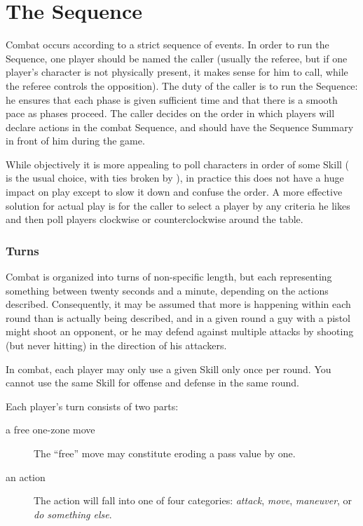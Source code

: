 \section{The Sequence}\label{sec:personal-combat-sequence}

Combat occurs according to a strict sequence of events. In order to run the Sequence, one player should be named the caller (usually the referee, but if one player's character is not physically present, it makes sense for him to call, while the referee controls the opposition). 
The duty of the caller is to run the Sequence: he ensures that each phase is given sufficient time and that there is a smooth pace as phases proceed. 
The caller decides on the order in which players will declare actions in the combat Sequence, and should have the Sequence Summary in front of him during the game.

While objectively it is more appealing to poll characters in order of some Skill ( is the usual choice, with ties broken by ), in practice this does not have a huge impact on play except to slow it down and confuse the order. A more effective solution for actual play is for the caller to select a player by any criteria he likes and then poll players clockwise or counterclockwise around the table.

\subsubsection{Turns}

Combat is organized into turns of non-specific length, but each representing something between twenty seconds and a minute, depending on the actions described. Consequently, it may be assumed that more is happening within each round than is actually being described, and in a given round a guy with a pistol might shoot an opponent, or he may defend against multiple attacks by shooting (but never hitting) in the direction of his attackers.

In combat, each player may only use a given Skill only once per round. You cannot use the same Skill for offense and defense in the same round.

Each player's turn consists of two parts:
\begin{description}
\item [a free one-zone move]
%
The ``free'' move may constitute eroding a pass value by one.

\item [an action] The action will fall into one of four categories: \emph{attack}, \emph{move}, \emph{maneuver}, or \emph{do something else}.
\end{description}

